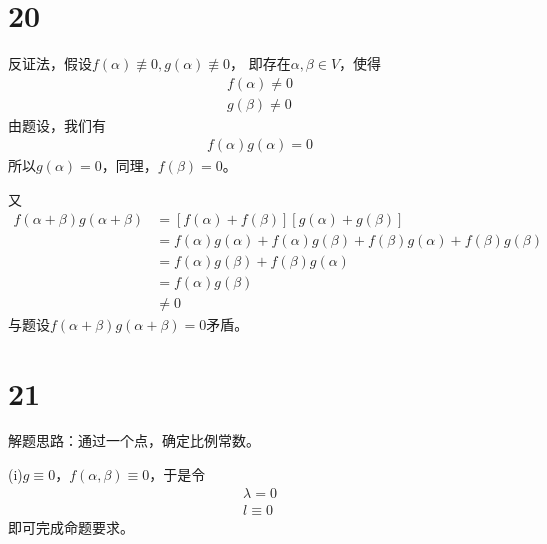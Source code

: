 \documentclass{article}
\begin{document}
\section*{20}

反证法，假设$f(\alpha) \not \equiv 0, g(\alpha) \not \equiv 0$，
即存在$\alpha, \beta \in V$，使得
\begin{align*}
  f(\alpha) \neq 0 \\
  g(\beta) \neq 0
\end{align*}
由题设，我们有
\begin{align*}
  f(\alpha ) g(\alpha) = 0
\end{align*}
所以$g(\alpha) = 0$，同理，$f(\beta) = 0$。

又
\begin{align*}
  f(\alpha + \beta) g(\alpha + \beta)
   & = [f(\alpha) + f(\beta)][g(\alpha) + g(\beta)]                                      \\
   & = f(\alpha) g(\alpha) + f(\alpha) g(\beta) + f(\beta) g(\alpha) + f(\beta) g(\beta) \\
   & = f(\alpha) g(\beta) + f(\beta) g(\alpha)                                           \\
   & = f(\alpha) g(\beta)                                                                \\
   & \neq 0
\end{align*}
与题设$f(\alpha + \beta) g(\alpha + \beta) = 0$矛盾。

\section*{21}

解题思路：通过一个点，确定比例常数。

 (i)$g \equiv 0$，$f(\alpha, \beta) \equiv 0$，于是令
\begin{align*}
  \lambda = 0 \\
  l \equiv 0
\end{align*}
即可完成命题要求。
\end{document}
